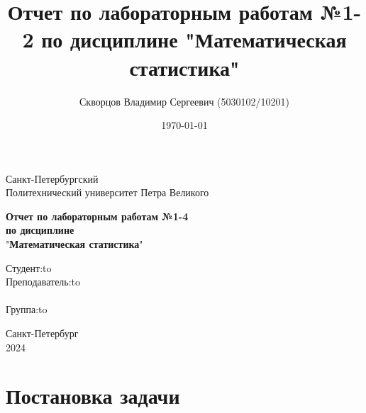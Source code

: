 \documentclass[12pt,a4paper]{article}
\title{Отчет по лабораторным работам №1-2 по дисциплине "Математическая статистика"}
\author{Скворцов Владимир Сергеевич (5030102/10201)}
\date{\today}
\begin{document}
	\begin{titlepage}

		\Large

		\begin{center}
			Санкт-Петербургский \\ Политехнический университет Петра Великого

			\vspace{10em}

			\textbf{Отчет по лабораторным работам №1-4} \\
			\textbf{по дисциплине}\\
			"\textbf{Математическая статистика}"

			\vspace{2em}

		\end{center}

		\vspace{6em}

		\newbox{\lbox}
		\newlength{\maxl}
		\setlength{\maxl}{\wd\lbox}
		\hfill\parbox{12cm}{
			\hspace*{3cm}\hspace*{-5cm}Студент:\hfill\hbox to\\
			\hspace*{3cm}\hspace*{-5cm}Преподаватель:\hfill\hbox to\\
			\\
			\hspace*{3cm}\hspace*{-5cm}Группа:\hfill\hbox to\\
		}

		\vspace{\fill}

		\begin{center}
			Санкт-Петербург \\ 2024
		\end{center}

	\end{titlepage}

	\tableofcontents\newpage

	\section{Постановка задачи}
\end{document}
